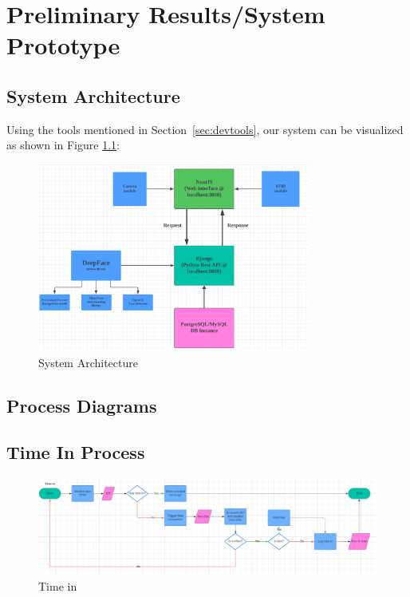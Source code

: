 \chapter{Preliminary Results/System Prototype}

\section{System Architecture}
Using the tools mentioned in Section~\ref{sec:devtools}, our system can be visualized as shown in Figure \ref{fig:architecture}: 
\begin{figure}[h] %
	\centering
	\includegraphics[width=0.8\textwidth]{figures/chapter4/architecture.png} %
	\caption{System Architecture}
	\label{fig:architecture}
\end{figure}
\section{Process Diagrams}
\section{Time In Process}
\begin{figure}[h] %
	\centering
	\includegraphics[width=1.0\textwidth]{figures/chapter4/timein.png} %
	\caption{Time in}
	\label{fig:timein}
\end{figure}

